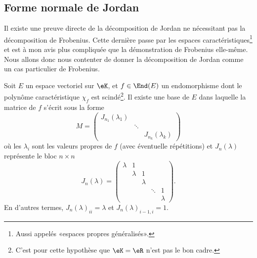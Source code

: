 \subsection{Forme normale de Jordan}

Il existe une preuve directe de la décomposition de Jordan ne nécessitant pas la décomposition de Frobenius\cite{LecLinAlgAllen}. Cette dernière passe par les espaces caractéristiques\footnote{Aussi appelés «espaces propres généralisés».} et est à mon avis plus compliquée que la démonstration de Frobenius elle-même. Nous allons donc nous contenter de donner la décomposition de Jordan comme un cas particulier de Frobenius.

\begin{theorem}
    Soit \( E\) un espace vectoriel sur \( \eK\), et \( f\in\End(E)\) un endomorphisme dont le polynôme caractéristique \( \chi_f\) est scindé\footnote{C'est pour cette hypothèse que \( \eK=\eR\) n'est pas le bon cadre.}. Il existe une base de \( E\) dans laquelle la matrice de \( f\) s'écrit sous la forme
    \begin{equation}
        M=\begin{pmatrix}
            J_{n_1}(\lambda_1)    &       &       \\
                &   \ddots    &       \\
                &       &   J_{n_k}(\lambda_k)
        \end{pmatrix}
    \end{equation}
    où les \( \lambda_i\) sont les valeurs propres de \( f\) (avec éventuelle répétitions) et \( J_n(\lambda)\) représente le bloc \( n\times n\)
    \begin{equation}
        J_n(\lambda)=\begin{pmatrix}
            \lambda    &   1    &       &       &   \\  
                &   \lambda    &   1    &       &   \\  
                &       &   \lambda    &       &   \\  
                &       &       &   \ddots    &   1\\  
                &       &       &       &   \lambda    
        \end{pmatrix}.
    \end{equation}
    En d'autres termes, \( J_n(\lambda)_{ii}=\lambda\) et \( J_n(\lambda)_{i-1,i}=1\).    
\end{theorem}

